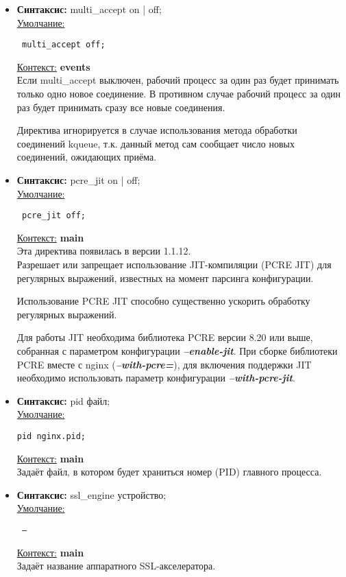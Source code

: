 \documentclass[a4paper,10pt,twoside]{article}
\begin{document}
\begin{itemize}
\item \textbf{Синтаксис:} multi\_accept on | off;\\
\underline{Умолчание:}
\begin{verbatim}
 multi_accept off;
\end{verbatim} 
\underline{Контекст:} \textbf{events}\\
Если multi\_accept выключен, рабочий процесс за один раз будет принимать только одно новое соединение. В противном случае рабочий процесс за один раз будет принимать сразу все новые соединения.

Директива игнорируется в случае использования метода обработки соединений kqueue, т.к. данный метод сам сообщает число новых соединений, ожидающих приёма.

\item \textbf{Синтаксис:} pcre\_jit on | off;\\
\underline{Умолчание:}
\begin{verbatim}
 pcre_jit off;
\end{verbatim} 
\underline{Контекст:} \textbf{main}\\
Эта директива появилась в версии 1.1.12.\\
Разрешает или запрещает использование JIT-компиляции (PCRE JIT) для регулярных выражений, известных на момент парсинга конфигурации.

Использование PCRE JIT способно существенно ускорить обработку регулярных выражений.

Для работы JIT необходима библиотека PCRE версии 8.20 или выше, собранная с параметром конфигурации \textbf{\textit{--enable-jit}}. При сборке библиотеки PCRE вместе с nginx (\textbf{\textit{--with-pcre=}}), для включения поддержки JIT необходимо использовать параметр конфигурации \textit{\textbf{--with-pcre-jit}}.

\item \textbf{Синтаксис:} pid файл;\\
\underline{Умолчание:}
\begin{verbatim}
pid nginx.pid;
\end{verbatim} 
\underline{Контекст:} \textbf{main}\\
Задаёт файл, в котором будет храниться номер (PID) главного процесса.

\item \textbf{Синтаксис:} ssl\_engine устройство;\\
\underline{Умолчание:}
\begin{verbatim}
 —
\end{verbatim} 
\underline{Контекст:} \textbf{main}\\
Задаёт название аппаратного SSL-акселератора.


\end{itemize}
\end{document}

